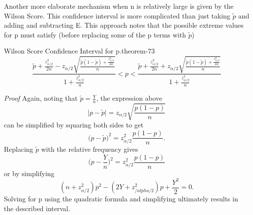 \documentclass[10pt,]{book}
\makeatletter
\renewcommand*{\proofname}{Proof}
\renewenvironment{proof}[1][\proofname]{\par
  \pushQED{\qed}%
  \normalfont \topsep6\p@\@plus6\p@\relax
  \trivlist
  \item\relax
    {\itshape
    #1\@addpunct{.}}\hspace\labelsep\ignorespaces
}{%
  \popQED\endtrivlist\@endpefalse
}
\numberwithin{equation}{section}
\newcommand{\lt}{<}
\makeatother
\begin{document}
\par
\hypertarget{p-1350}{}%
Another more elaborate mechanism when n is relatively large is given by the Wilson Score. This confidence interval is more complicated than just taking \(\tilde{p}\) and adding and subtracting E. This approach notes that the possible extreme values for p must satisfy (before replacing some of the p terms with \(\tilde{p}\))%
\par
\hypertarget{p-1351}{}%
\begin{theorem}{Wilson Score Confidence Interval for p.}{}{theorem-73}%
\hypertarget{p-1352}{}%
%
\begin{equation*}
\frac{\tilde{p} + \frac{z_{\alpha/2}^2}{2n} - z_{\alpha/2} \sqrt{\frac{\tilde{p}(1-\tilde{p}) + \frac{z_{\alpha/2}^2}{4n}}{n}}}{1 + \frac{z_{\alpha/2}^2}{n}} \lt p \lt \frac{\tilde{p} + \frac{z_{\alpha/2}^2}{2n} + z_{\alpha/2} \sqrt{\frac{\tilde{p}(1-\tilde{p}) + \frac{z_{\alpha/2}^2}{4n}}{n}}}{1 + \frac{z_{\alpha/2}^2}{n}}
\end{equation*}
%
\end{theorem}
\begin{proof}\hypertarget{proof-73}{}
\hypertarget{p-1353}{}%
Again, noting that \(\tilde{p} = \frac{Y}{n}\), the expression above%
\begin{equation*}
\big | p - \tilde{p} \big | = z_{\alpha /2} \sqrt{\frac{p(1-p)}{n}}
\end{equation*}
can be simplified by squaring both sides to get%
\begin{equation*}
\big ( p - \tilde{p} \big )^2 = z_{\alpha /2}^2 \frac{p(1-p)}{n}.
\end{equation*}
Replacing \(\tilde{p}\) with the relative frequency gives%
\begin{equation*}
\big ( p - \frac{Y}{n} \big )^2 = z_{\alpha /2}^2 \frac{p(1-p)}{n}
\end{equation*}
or by simplifying%
\begin{equation*}
(n+z_{\alpha /2}^2 )p^2 - (2Y+z_{/alpha /2}^2) p + \frac{Y^2}{2} = 0.
\end{equation*}
Solving for p using the quadratic formula and simplifying ultimately results in the described interval.%
\end{proof}
\end{document}
